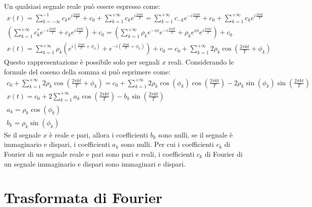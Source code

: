 \documentclass{article}
\numberwithin{equation}{subsection}
\begin{document}
Un qualsiasi segnale reale può essere espresso come:
\begin{gather*}
    x(t)=\displaystyle\sum_{k=-\infty}^{-1}c_ke^{i\frac{2\pi kt}{T}}+c_0+\sum_{k=1}^{+\infty}c_ke^{i\frac{2\pi kt}{T}}=\sum_{k=1}^{+\infty}c_{-k}e^{-i\frac{2\pi kt}{T}}+c_0+\sum_{k=1}^{+\infty}c_ke^{i\frac{2\pi kt}{T}}\\
    \displaystyle\left(\sum_{k=1}^{+\infty}c_k^*e^{-i\frac{2\pi kt}{T}}+c_ke^{i\frac{2\pi kt}{T}}\right)+c_0=\left(\sum_{k=1}^{+\infty}\rho_k e^{-i\phi}e^{-i\frac{2\pi kt}{T}}+\rho_ke^{i\phi}e^{i\frac{2\pi kt}{T}}\right)+c_0\\
    x(t)=\displaystyle\sum_{k=1}^{+\infty}\rho_k \left(e^{i\left(\frac{2\pi kt}{T}+\phi_k\right)}+e^{-i\left(\frac{2\pi kt}{T}+\phi_k\right)}\right)+c_0=\displaystyle c_0+\sum_{k=1}^{+\infty}2\rho_k\cos\left(\frac{2\pi kt}{T}+\phi_k\right)
\end{gather*}
Questo rappresentazione è possibile solo per segnali $x$ reali. 
Considerando le formule del coseno della somma si può esprimere come:
\begin{gather*}
    \displaystyle c_0+\sum_{k=1}^{+\infty}2\rho_k\cos\left(\frac{2\pi kt}{T}+\phi_k\right)=
    c_0+\sum_{k=1}^{+\infty}2\rho_k\cos(\phi_k)\cos\left(\frac{2\pi kt}{T}\right)-2\rho_k\sin(\phi_k)\sin\left(\frac{2\pi kt}{T}\right)\\
    x(t)=\displaystyle c_0+2\sum_{k=1}^{+\infty}a_k\cos\left(\frac{2\pi kt}{T}\right)-b_k\sin\left(\frac{2\pi kt}{T}\right)\\
    a_k=\rho_k\cos(\phi_k)\\
    b_k=\rho_k\sin(\phi_k)
\end{gather*}
Se il segnale $x$ è reale e pari, allora i coefficienti $b_k$ sono nulli, se il segnale è immaginario e dispari, i coefficienti $a_k$ sono nulli. 
Per cui i coefficienti $c_k$ di Fourier di un segnale reale e pari sono pari e reali, i coefficienti $c_k$ di Fourier di un segnale immaginario e 
dispari sono immaginari e dispari. 

\clearpage

\section{Trasformata di Fourier}
\end{document}

